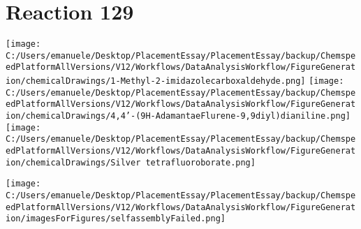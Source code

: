\documentclass{article}%
\begin{document}
\section*{Reaction 129}%
%
\begin{scheme}[H]%
\begin{minipage}{0.5\textwidth}%
\texttt{[image: C:/Users/emanuele/Desktop/PlacementEssay/PlacementEssay/backup/ChemspeedPlatformAllVersions/V12/Workflows/DataAnalysisWorkflow/FigureGeneration/chemicalDrawings/1-Methyl-2-imidazolecarboxaldehyde.png]}%
\texttt{[image: C:/Users/emanuele/Desktop/PlacementEssay/PlacementEssay/backup/ChemspeedPlatformAllVersions/V12/Workflows/DataAnalysisWorkflow/FigureGeneration/chemicalDrawings/4,4'-(9H-AdamantaeFlurene-9,9diyl)dianiline.png]}%
\texttt{[image: C:/Users/emanuele/Desktop/PlacementEssay/PlacementEssay/backup/ChemspeedPlatformAllVersions/V12/Workflows/DataAnalysisWorkflow/FigureGeneration/chemicalDrawings/Silver tetrafluoroborate.png]}%
\end{minipage}%
\begin{minipage}{0.5\textwidth}%
\begin{center}%
\texttt{[image: C:/Users/emanuele/Desktop/PlacementEssay/PlacementEssay/backup/ChemspeedPlatformAllVersions/V12/Workflows/DataAnalysisWorkflow/FigureGeneration/imagesForFigures/selfassemblyFailed.png]}%
\end{center}%
\end{minipage}%
\caption{Self-assembly of components 12, 13, with Silver(I) in a 3.0:1.5:1.0 molar ratio in CH$_3$CN at 60\textdegree C for 40h. These are the reagents (starting materials) for reaction 129.}%
\end{scheme}%
\end{document}
